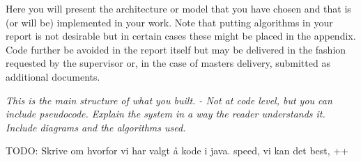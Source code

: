 Here you will present the architecture or model that you have chosen and that is (or will be) implemented in your work. Note that putting algorithms in your report is not desirable but in certain cases these might be placed in the appendix. Code further be avoided in the report itself but may be delivered in the fashion requested by the supervisor or, in the case of masters delivery, submitted as additional documents. 

\textit{This is the main structure of what you built.
- Not at code level, but you can include pseudocode.
Explain the system in a way the reader understands it.
Include diagrams and the algorithms used.}

TODO: Skrive om hvorfor vi har valgt å kode i java. speed, vi kan det best, ++













